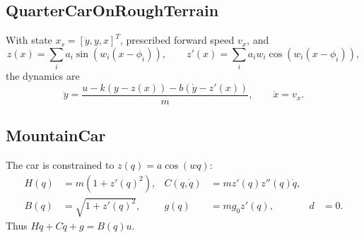 \documentclass[11pt]{article}
\begin{document}
\subsection{QuarterCarOnRoughTerrain}
With state \(x_s=[\dot y,y,x]^T\), prescribed forward speed \(v_x\), and
\begin{equation}
    z(x)=\sum_i a_i\sin(w_i(x-\phi_i)),\qquad
    z'(x)=\sum_i a_iw_i\cos(w_i(x-\phi_i)),
\end{equation}
the dynamics are
\begin{equation}
    \ddot y =
    \frac{u-k(y-z(x))-b(\dot y-z'(x))}{m},
    \qquad
    \dot x=v_x.
\end{equation}

\subsection{MountainCar}
The car is constrained to \(z(q)=a\cos(wq)\):
\begin{align}
    H(q)&=m(1+z'(q)^2),
    &
    C(q,\dot q)&=mz'(q)z''(q)\dot q,\\
    B(q)&=\sqrt{1+z'(q)^2},
    &
    g(q)&=mg_0z'(q),
    &
    d&=0.
\end{align}
Thus \(H\ddot q+C\dot q+g=B(q)u\).
\end{document}
